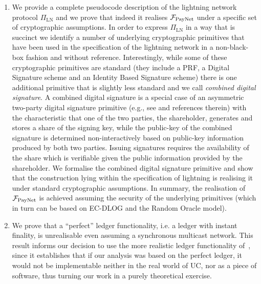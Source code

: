 \begin{enumerate}
\item We provide a complete pseudocode description of the lightning network
protocol $\Pi_{\mathrm{LN}}$ and we prove that indeed it realises $\mathcal{F}_{\mathrm{PayNet}}{}$
under a specific set of cryptographic assumptions. In order to express
$\Pi_{\mathrm{LN}}$ in a way that is succinct we identify a number of underlying
cryptographic primitives that have been used in the specification of the
lightning network in a non-black-box fashion and without reference.
Interestingly, while some of these cryptographic primitives are standard (they
include a PRF, a Digital Signature scheme and an Identity Based Signature
scheme) there is one additional primitive that is slightly less standard and we
call {\em combined digital signature}. A combined digital signature is a special
case of an asymmetric two-party digital signature primitive (e.g., see
\cite{DBLP:conf/ndss/NicolosiKDM03} and references therein) with the
characteristic that one of the two parties, the shareholder, generates and
stores a share of the signing key, while the public-key of the combined
signature is determined non-interactively based on public-key information
produced by both two parties. Issuing signatures requires the availability of
the share which is verifiable given the public information provided by the
shareholder. We formalise the combined digital signature primitive and show that
the construction lying within the specification of lightning is realising it
under standard cryptographic assumptions. In summary, the realisation of
$\mathcal{F}_{\mathrm{PayNet}}{}$ is achieved assuming the security of the underlying primitives
(which in turn can be based on EC-DLOG and the Random Oracle model).

\item {} We prove that a ``perfect'' ledger functionality, i.e. a
ledger with instant finality, is unrealisable even assuming a synchronous
multicast network. This result informs our decision to use the more realistic
ledger functionality of~\cite{BMTZ17}, since it establishes that if our analysis
was based on the perfect ledger, it would not be implementable neither in the
real world of UC, nor as a piece of software, thus turning our work in a purely
theoretical exercise.
\end{enumerate}

